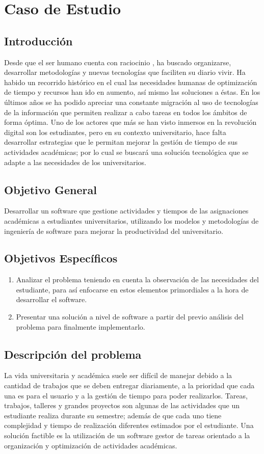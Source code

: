 \chapter{Caso de Estudio}
\section{Introducción}
Desde que el ser humano cuenta con raciocinio , ha buscado organizarse, desarrollar metodologías y nuevas tecnologías que faciliten su diario vivir. Ha habido un recorrido histórico en el cual las necesidades humanas de optimización de tiempo y recursos han ido en aumento, así mismo las soluciones a éstas. 
En los últimos años se ha podido apreciar una constante migración al uso de tecnologías de la información que permiten realizar a cabo tareas en todos los ámbitos de forma óptima. Uno de los actores que más se han visto inmersos en la revolución digital son los estudiantes, pero en su contexto universitario, hace falta desarrollar estrategias que le permitan mejorar la gestión de tiempo de sus actividades académicas; por lo cual se buscará una solución tecnológica que se adapte a las necesidades de los universitarios.
\section{Objetivo General}
Desarrollar un software que gestione actividades y tiempos de las asignaciones académicas a estudiantes universitarios, utilizando los modelos y metodologías de ingeniería de software para mejorar la productividad del universitario.

\section{Objetivos Específicos}
\begin{enumerate}
	\item Analizar el problema teniendo en cuenta la observación de las necesidades del estudiante, para así enfocarse en estos elementos primordiales a la hora de desarrollar el software.
	\item Presentar una solución a nivel de software a partir del previo análisis del problema para finalmente implementarlo. 
	
\end{enumerate}
\section{Descripción del problema}
La vida universitaria y académica suele ser difícil de manejar debido a la cantidad de trabajos que se deben entregar diariamente, a la prioridad que cada una es para el usuario y a la gestión de tiempo para poder realizarlos. Tareas, trabajos, talleres y grandes proyectos son algunas de las actividades que un estudiante realiza durante su semestre; además de que cada uno tiene complejidad y tiempo de realización diferentes estimados por el estudiante.
Una solución factible es la utilización de un software gestor de tareas orientado a la organización y  optimización de actividades académicas.

